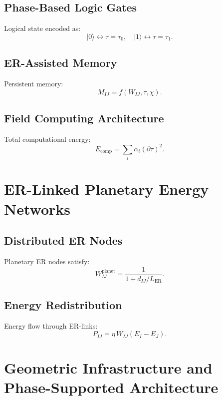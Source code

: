 \section{Phase-Based Logic Gates}
Logical state encoded as:
\[
|0\rangle \leftrightarrow \tau=\tau_0,
\quad
|1\rangle \leftrightarrow \tau=\tau_1.
\]

\section{ER-Assisted Memory}
Persistent memory:
\[
M_{IJ} = f(W_{IJ},\tau,\chi).
\]

\section{Field Computing Architecture}
Total computational energy:
\[
E_{\mathrm{comp}} = \sum_i \alpha_i (\partial\tau)^2.
\]


\chapter{ER-Linked Planetary Energy Networks}

\section{Distributed ER Nodes}
Planetary ER nodes satisfy:
\[
W_{IJ}^{\text{planet}} = \frac{1}{1 + d_{IJ}/L_{\mathrm{ER}}}.
\]

\section{Energy Redistribution}
Energy flow through ER-links:
\[
P_{IJ} = \eta\, W_{IJ}(E_I - E_J).
\]



\chapter{Geometric Infrastructure and Phase-Supported Architecture}

